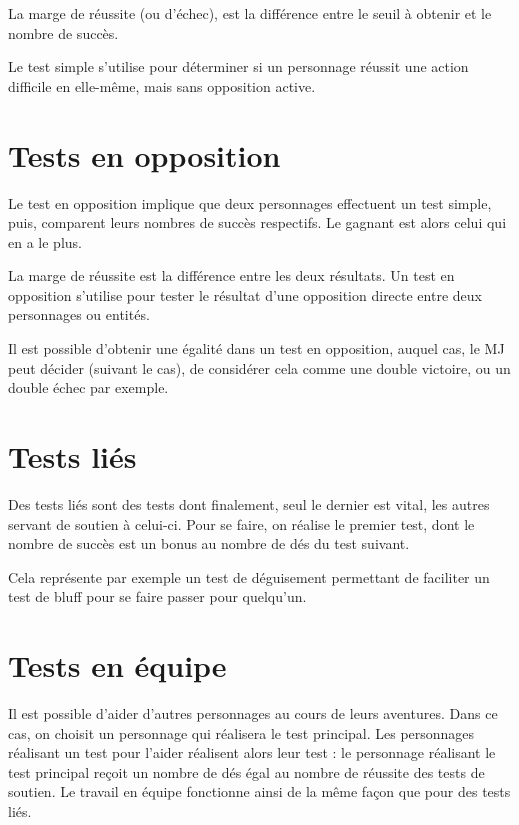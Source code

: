 \documentclass[10pt,a4paper,twocolumn]{book}
\begin{document}
La marge de réussite (ou d’échec), est la différence entre le seuil à obtenir et le nombre de succès.

Le test simple s’utilise pour déterminer si un personnage réussit une action difficile en elle-même, mais sans opposition active.
\section{Tests en opposition}
Le test en opposition implique que deux personnages effectuent un test simple, puis, comparent leurs nombres de succès respectifs. Le gagnant est alors celui qui en a le plus.

La marge de réussite est la différence entre les deux résultats.
Un test en opposition s’utilise pour tester le résultat d’une opposition directe entre deux personnages ou entités.

Il est possible d’obtenir une égalité dans un test en opposition, auquel cas, le MJ peut décider (suivant le cas), de considérer cela comme une double victoire, ou un double échec par exemple.
\section{Tests liés}
Des tests liés sont des tests dont finalement, seul le dernier est vital, les autres servant de soutien à celui-ci. Pour se faire, on réalise le premier test, dont le nombre de succès est un bonus au nombre de dés du test suivant.

Cela représente par exemple un test de déguisement permettant de faciliter un test de bluff pour se faire passer pour quelqu'un.
\section{Tests en équipe}
Il est possible d'aider d'autres personnages au cours de leurs aventures. Dans ce cas, on choisit un personnage qui réalisera le test principal. Les personnages réalisant un test pour l'aider réalisent alors leur test : le personnage réalisant le test principal reçoit un nombre de dés égal au nombre de réussite des tests de soutien. Le travail en équipe fonctionne ainsi de la même façon que pour des tests liés.
\end{document}
